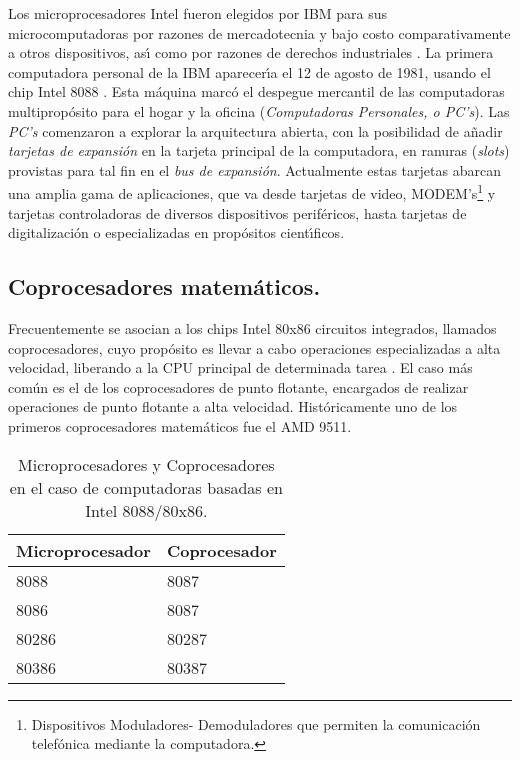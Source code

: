 Los microprocesadores Intel fueron elegidos por IBM para sus microcomputadoras por razones de %
mercadotecnia y bajo costo comparativamente a otros dispositivos, as\'{\i} como por razones de %
derechos industriales \cite{Micro:Hist}. La primera computadora personal de la IBM %
aparecer\'{\i}a el 12 de agosto de 1981, usando el chip Intel 8088 \cite{SADYR}. Esta %
m\'aquina marc\'o el despegue mercantil de las computadoras multiprop\'osito para el hogar y la %
oficina ({\it Computadoras Personales, o PC's\/}). Las {\it PC's} comenzaron a explorar la %
arquitectura abierta, con la posibilidad de a\~nadir {\em tarjetas de expansi\'on } en la %
tarjeta principal de la computadora, en ranuras ({\it slots\/}) provistas para tal fin en el %
{\em bus de expansi\'on\/}. Actualmente estas tarjetas abarcan una amplia gama de %
aplicaciones, que va desde tarjetas de video, MODEM's\footnote{Dispositivos Moduladores-%
Demoduladores que permiten la comunicaci\'on telef\'onica mediante la computadora.} y tarjetas %
controladoras de diversos dispositivos perif\'ericos, hasta tarjetas de digitalizaci\'on o %
especializadas en prop\'ositos cient\'{\i}ficos.


\subsection{Coprocesadores matem\'aticos.}
\label{Subseccion:coprocesadores}

Frecuentemente se asocian a los chips Intel 80x86 circuitos integrados, llamados coprocesadores, %
cuyo prop\'osito es llevar a cabo operaciones es\-pe\-cia\-li\-za\-das a alta velocidad, %
liberando a la CPU principal de determinada tarea \cite{Godfrey}. El caso m\'as com\'un es el %
de los coprocesadores de punto flotante, encargados de realizar operaciones de punto flotante a %
alta velocidad. Hist\'oricamente uno de los primeros coprocesadores matem\'aticos fue el AMD %
9511. 

\begin{table}[!htb] 
\centering
\begin{tabular}{|l|l|} \hline
{\bf Microprocesador} & {\bf Coprocesador} \\ \hline
8088                  & 8087               \\ \hline
8086                  & 8087               \\ \hline
80286                 & 80287              \\ \hline
80386                 & 80387              \\ \hline
\end{tabular} 
\caption{Microprocesadores y Coprocesadores en el caso de computadoras basadas en Intel %
8088/80x86.} 
\label{tabla:micro-y-copro}
\end{table}

